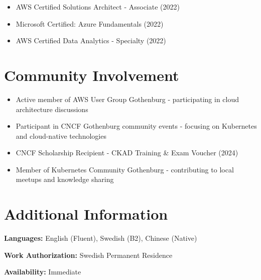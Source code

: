 \documentclass[11pt,a4paper]{article}
\begin{document}
\begin{itemize}[leftmargin=*, itemsep=2pt]
\item AWS Certified Solutions Architect - Associate (2022)
\item Microsoft Certified: Azure Fundamentals (2022)
\item AWS Certified Data Analytics - Specialty (2022)
\end{itemize}

\section*{Community Involvement}

\begin{itemize}[leftmargin=*, itemsep=2pt]
\item Active member of AWS User Group Gothenburg - participating in cloud architecture discussions
\item Participant in CNCF Gothenburg community events - focusing on Kubernetes and cloud-native technologies
\item CNCF Scholarship Recipient - CKAD Training \& Exam Voucher (2024)
\item Member of Kubernetes Community Gothenburg - contributing to local meetups and knowledge sharing
\end{itemize}

\section*{Additional Information}

\textbf{Languages:} English (Fluent), Swedish (B2), Chinese (Native)

\textbf{Work Authorization:} Swedish Permanent Residence

\textbf{Availability:} Immediate
\end{document}
